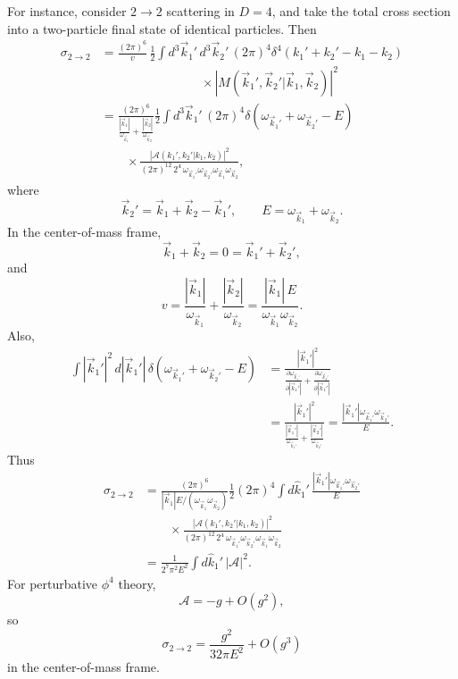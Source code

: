 For instance, consider \(2\to2\) scattering in \(D=4\), and take the total
cross section into a two-particle final state of identical particles. Then
\[
\begin{aligned}
\sigma_{2\to2}
&=
\frac{(2\pi)^6}{v}\,
\frac12
\int d^3\vec k_1'\,d^3\vec k_2'\,
(2\pi)^4\delta^4(k_1'+k_2'-k_1-k_2)
\\
&\qquad\qquad\qquad\qquad\times
\left|M(\vec k_1',\vec k_2'|\vec k_1,\vec k_2)\right|^2
\\
&=
\frac{(2\pi)^6}{
  \frac{|\vec k_1|}{\omega_{\vec k_1}}
  +
  \frac{|\vec k_2|}{\omega_{\vec k_2}}
}
\frac12
\int d^3\vec k_1'\,
(2\pi)^4
\delta(\omega_{\vec k_1'}+\omega_{\vec k_2'}-E)
\\
&\qquad\times
\frac{
  \left|\mathcal A(k_1',k_2'|k_1,k_2)\right|^2
}{
  (2\pi)^{12}\,2^4\,
  \omega_{\vec k_1'}\omega_{\vec k_2'}
  \omega_{\vec k_1}\omega_{\vec k_2}
},
\end{aligned}
\]
where
\[
  \vec k_2'=\vec k_1+\vec k_2-\vec k_1',
  \qquad
  E=\omega_{\vec k_1}+\omega_{\vec k_2}.
\]
In the center-of-mass frame,
\[
  \vec k_1+\vec k_2=0=\vec k_1'+\vec k_2',
\]
and
\[
  v=
  \frac{|\vec k_1|}{\omega_{\vec k_1}}
  +
  \frac{|\vec k_2|}{\omega_{\vec k_2}}
  =
  \frac{|\vec k_1|\,E}{\omega_{\vec k_1}\omega_{\vec k_2}}.
\]
Also,
\[
\begin{aligned}
\int |\vec k_1'|^2\,d|\vec k_1'|\,
\delta(\omega_{\vec k_1'}+\omega_{\vec k_2'}-E)
&=
\frac{|\vec k_1'|^2}{
  \frac{\partial\omega_{\vec k_1'}}{\partial |\vec k_1'|}
  +
  \frac{\partial\omega_{\vec k_2'}}{\partial |\vec k_1'|}
}
\\
&=
\frac{|\vec k_1'|^2}{
  \frac{|\vec k_1'|}{\omega_{\vec k_1'}}
  +
  \frac{|\vec k_2'|}{\omega_{\vec k_2'}}
}
 =
 \frac{|\vec k_1'|\omega_{\vec k_1'}\omega_{\vec k_2'}}{E}.
\end{aligned}
\]
Thus
\[
\begin{aligned}
\sigma_{2\to2}
&=
\frac{(2\pi)^6}{
  |\vec k_1|E/(\omega_{\vec k_1}\omega_{\vec k_2})
}
\frac12(2\pi)^4
\int d\hat k_1'\,
\frac{|\vec k_1'|\omega_{\vec k_1'}\omega_{\vec k_2'}}{E}
\\
&\qquad\times
\frac{\left|\mathcal A(k_1',k_2'|k_1,k_2)\right|^2}{
  (2\pi)^{12}\,2^4\,
  \omega_{\vec k_1'}\omega_{\vec k_2'}
  \omega_{\vec k_1}\omega_{\vec k_2}}
\\
&=
\frac{1}{2^7\pi^2 E^2}
\int d\hat k_1'\,\left|\mathcal A\right|^2 .
\end{aligned}
\]
For perturbative \(\phi^4\) theory,
\[
  \mathcal A=-g+O(g^2),
\]
so
\[
  \sigma_{2\to2}
  =
  \frac{g^2}{32\pi E^2}+O(g^3)
\]
in the center-of-mass frame.

